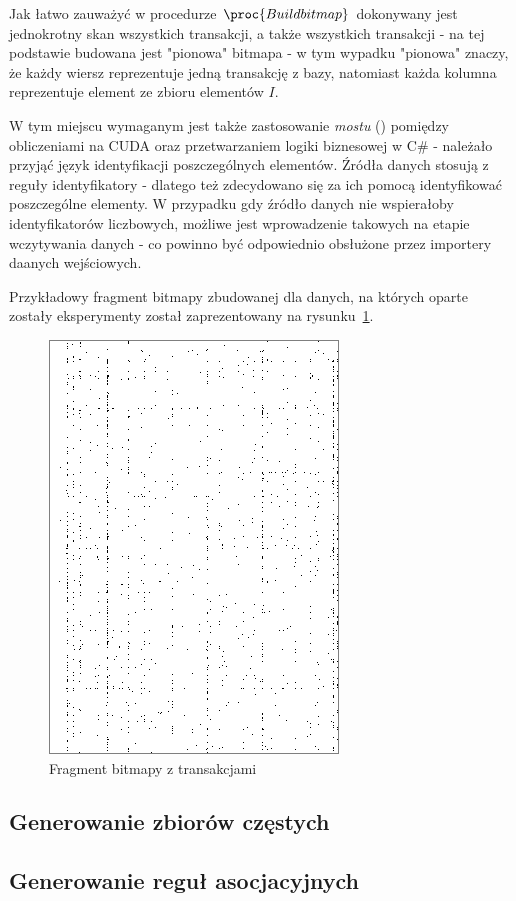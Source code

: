 Jak łatwo zauważyć w procedurze $\proc{Build bitmap}$ dokonywany jest jednokrotny skan wszystkich transakcji, a także wszystkich transakcji - na tej podstawie budowana jest "pionowa" bitmapa - w tym wypadku "pionowa" znaczy, że każdy wiersz reprezentuje jedną transakcję z bazy, natomiast każda kolumna reprezentuje element ze zbioru elementów $I$.

W tym miejscu wymaganym jest także zastosowanie \emph{mostu} () pomiędzy obliczeniami na CUDA oraz przetwarzaniem logiki biznesowej w C\# - należało przyjąć język identyfikacji poszczególnych elementów. Źródła danych stosują z reguły identyfikatory - dlatego też zdecydowano się za ich pomocą identyfikować poszczególne elementy. W przypadku gdy źródło danych nie wspierałoby identyfikatorów liczbowych, możliwe jest wprowadzenie takowych na etapie wczytywania danych - co powinno być odpowiednio obsłużone przez importery daanych wejściowych.

Przykładowy fragment bitmapy zbudowanej dla danych, na których oparte zostały eksperymenty został zaprezentowany na rysunku~\ref{rys:data_1}.

\begin{figure}[ht]
\centering
\includegraphics{figures/05/data_1.png}
\caption{Fragment bitmapy z transakcjami}\label{rys:data_1}
\end{figure}

\subsection{Generowanie zbiorów częstych}\label{capriori:gen}

\subsection{Generowanie reguł asocjacyjnych}